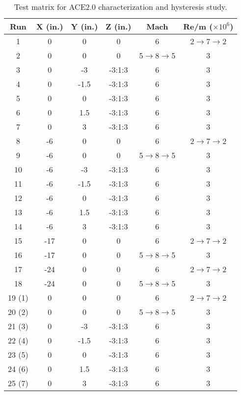 \begin{table}[ht]
    \centering
    \label{tab:ace2-survey}
    \begin{tabular}{|c|c|c|c|c|c|}
        \hline
        \textbf{Run} & \textbf{X (in.)} & \textbf{Y (in.)} & \textbf{Z (in.)} & \textbf{Mach} & \textbf{Re/m ($\times10^6$)} \\ \hline
        1 & 0 & 0 & 0 & 6 & 2$\to$7$\to$2 \\ \hline
        2 & 0 & 0 & 0 & 5$\to$8$\to$5 & 3 \\ \hline
        3 & 0 & -3 & -3:1:3 & 6 & 3 \\ \hline
        4 & 0 & -1.5 & -3:1:3 & 6 & 3 \\ \hline
        5 & 0 & 0 & -3:1:3 & 6 & 3 \\ \hline
        6 & 0 & 1.5 & -3:1:3 & 6 & 3 \\ \hline
        7 & 0 & 3 & -3:1:3 & 6 & 3 \\ \hline
        8 & -6 & 0 & 0 & 6 & 2$\to$7$\to$2 \\ \hline
        9 & -6 & 0 & 0 & 5$\to$8$\to$5 & 3 \\ \hline
        10 & -6 & -3 & -3:1:3 & 6 & 3 \\ \hline
        11 & -6 & -1.5 & -3:1:3 & 6 & 3 \\ \hline
        12 & -6 & 0 & -3:1:3 & 6 & 3 \\ \hline
        13 & -6 & 1.5 & -3:1:3 & 6 & 3 \\ \hline
        14 & -6 & 3 & -3:1:3 & 6 & 3 \\ \hline
        15 & -17 & 0 & 0 & 6 & 2$\to$7$\to$2 \\ \hline
        16 & -17 & 0 & 0 & 5$\to$8$\to$5 & 3 \\ \hline
        17 & -24 & 0 & 0 & 6 & 2$\to$7$\to$2 \\ \hline
        18 & -24 & 0 & 0 & 5$\to$8$\to$5 & 3 \\ \hline
        19 (1) & 0 & 0 & 0 & 6 & 2$\to$7$\to$2 \\ \hline
        20 (2)& 0 & 0 & 0 & 5$\to$8$\to$5 & 3 \\ \hline
        21 (3) & 0 & -3 & -3:1:3 & 6 & 3 \\ \hline
        22 (4) & 0 & -1.5 & -3:1:3 & 6 & 3 \\ \hline
        23 (5) & 0 & 0 & -3:1:3 & 6 & 3 \\ \hline
        24 (6) & 0 & 1.5 & -3:1:3 & 6 & 3 \\ \hline
        25 (7) & 0 & 3 & -3:1:3 & 6 & 3 \\ \hline
    \end{tabular}
    \caption{Test matrix for ACE2.0 characterization and hysteresis study.}
\end{table}

